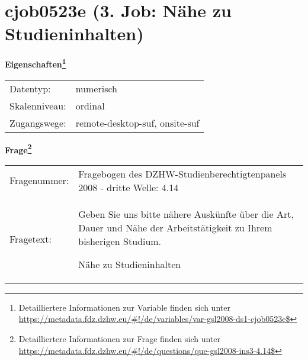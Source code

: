
    \setcounter{footnote}{0}

    \vspace*{-1.8cm}
	\section{cjob0523e (3. Job: Nähe zu Studieninhalten)}
	\label{section:cjob0523e}



    \vspace*{0.5cm}
    \noindent\textbf{Eigenschaften\footnote{Detailliertere Informationen zur Variable finden sich unter
		\url{https://metadata.fdz.dzhw.eu/\#!/de/variables/var-gsl2008-ds1-cjob0523e$}}}\\
	\begin{tabularx}{\hsize}{@{}lX}
	Datentyp: & numerisch \\
	Skalenniveau: & ordinal \\
	Zugangswege: &
	  remote-desktop-suf, 
	  onsite-suf
 \\
    \end{tabularx}



				\vspace*{0.5cm}
                \noindent\textbf{Frage\footnote{Detailliertere Informationen zur Frage finden sich unter
		              \url{https://metadata.fdz.dzhw.eu/\#!/de/questions/que-gsl2008-ins3-4.14$}}}\\
				\begin{tabularx}{\hsize}{@{}lX}
					Fragenummer: &
					  Fragebogen des DZHW-Studienberechtigtenpanels 2008 - dritte Welle:
					  4.14
 \\
					Fragetext: & Geben Sie uns bitte nähere Auskünfte über die Art, Dauer und Nähe der Arbeitstätigkeit zu Ihrem bisherigen Studium.\par  Nähe zu Studieninhalten \\
				\end{tabularx}





